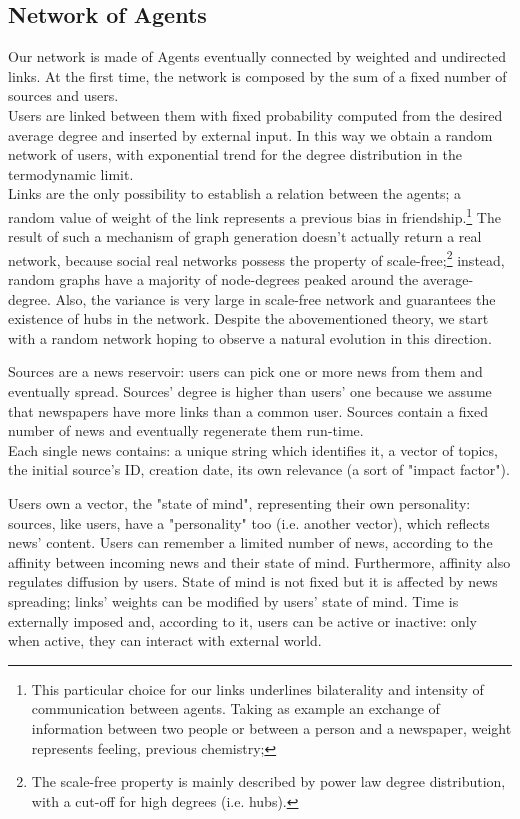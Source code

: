 \subsection{Network of Agents}
Our network is made of Agents eventually connected by weighted and undirected links.
At the first time, the network is composed by the sum of a fixed number of sources and users. \\
Users are linked between them with fixed probability computed from the desired average degree and inserted by external input.
 In this way we obtain a random network of users, with exponential trend for the degree distribution in the termodynamic limit.
\\ Links are the only possibility to establish a relation between the agents; a random value of weight of the link represents a previous bias in 
friendship.\footnote{This particular choice for our links underlines bilaterality and intensity of communication between agents.
Taking as example an exchange of information between two people or between a person and a newspaper, weight represents feeling, previous chemistry;}
The result of such a mechanism of graph generation doesn't actually return a real network, because social real networks possess the property of 
scale-free;\footnote{The scale-free property is mainly described by power law degree distribution, with a cut-off for high degrees (i.e. hubs). } instead, random graphs have a majority of node-degrees peaked around the average-degree. 
Also, the variance is very large in scale-free network and guarantees the existence of hubs in the network.
Despite the abovementioned theory, we start with a random network hoping to observe a natural evolution in this direction.

Sources are a news reservoir: users can pick one or more news from them and eventually spread.
Sources' degree is higher than users' one because we assume that newspapers have more links than a common user.
Sources contain a fixed number of news and eventually regenerate them run-time. \\
Each single news contains: a unique string which identifies it, a vector of topics, the initial source's ID, creation date, its own relevance (a sort of "impact factor").

Users own a vector, the "state of mind", representing their own personality: sources, like users, have a "personality" too (i.e. another vector), which reflects news' content.
Users can remember a limited number of news, according to the affinity between incoming news and their state of mind.
Furthermore, affinity also regulates diffusion by users.
State of mind is not fixed but it is affected by news spreading; links' weights can be modified by users' state of mind.
Time is externally imposed and, according to it, users can be active or inactive: only when active, they can interact with external world.


